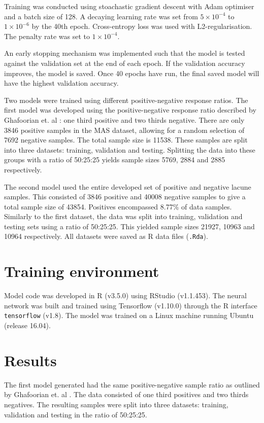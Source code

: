 Training was conducted using stoachastic gradient descent with Adam optimiser and a batch size of 128. A decaying learning rate was set from $5\times10^{-4}$ to $1\times10^{-6}$ by the 40th epoch. Cross-entropy loss was used with L2-regularisation. The penalty rate was set to $1\times10^{-4}$. 

An early stopping mechanism was implemented such that the model is tested against the validation set at the end of each epoch. If the validation accuracy improves, the model is saved. Once 40 epochs have run, the final saved model will have the highest validation accuracy.

Two models were trained using different positive-negative response ratios. The first model was developed using the positive-negative response ratio described by Ghafoorian et. al \cite{GhafoorianM.2017Dml3}: one third positive and two thirds negative. There are only 3846 positive samples in the MAS dataset, allowing for a random selection of 7692 negative samples. The total sample size is 11538. These samples are split into three datasets: training, validation and testing. Splitting the data into these groups with a ratio of 50:25:25 yields sample sizes 5769, 2884 and 2885 respectively.

The second model used the entire developed set of positive and negative lacune samples. This consisted of 3846 positive and 40008 negative samples to give a total sample size of 43854. Positives encompassed 8.77\% of data samples. Similarly to the first dataset, the data was split into training, validation and testing sets using a ratio of 50:25:25. This yielded sample sizes 21927, 10963 and 10964 respectively. All datasets were saved as R data files (\texttt{.Rda}).


\section{Training environment}

Model code was developed in R (v3.5.0) using RStudio (v1.1.453). The neural network was built and trained using Tensorflow (v1.10.0) through the R interface \texttt{tensorflow} (v1.8). The model was trained on a Linux machine running Ubuntu (release 16.04). 

\section{Results}

The first model generated had the same positive-negative sample ratio as outlined by Ghafoorian et. al \cite{GhafoorianM.2017Dml3}. The data consisted of one third positives and two thirds negatives. The resulting samples were split into three datasets: training, validation and testing in the ratio of 50:25:25.

